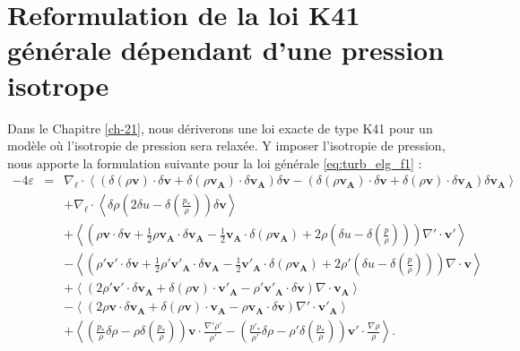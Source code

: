 \section{Reformulation de la loi \acs{K41} générale dépendant d'une pression isotrope}
\label{sec-132}

Dans le Chapitre \ref{ch-21}, nous dériverons une loi exacte de type \acs{K41} pour un modèle où l'isotropie de pression sera relaxée. Y imposer l'isotropie de pression, nous apporte la formulation suivante pour la loi générale \eqref{eq:turb_elg_f1} : 
\begin{equation}
\boxed{
\begin{array}{lcl}
\label{eq:turb_elg_f2}-4\varepsilon &=& \nabla_{\boldsymbol{\ell}} \cdot \left<\left(\delta \left(\rho\boldsymbol{v}\right) \cdot \delta \boldsymbol{v}+ \delta \left(\rho\boldsymbol{v_A}\right) \cdot \delta \boldsymbol{v_A}\right) \delta \boldsymbol{v}  -\left(\delta \left(\rho\boldsymbol{v_A}\right) \cdot \delta \boldsymbol{v}  + \delta \left(\rho\boldsymbol{v}\right) \cdot \delta \boldsymbol{v_A}  \right) \delta \boldsymbol{v_A} \right>\\
&& + \nabla_{\boldsymbol{\ell}} \cdot \left<\delta \rho  \left(2\delta u - \delta \left(\frac{p_*}{\rho}\right)\right)\delta \boldsymbol{v}\right> \\
&& +\left< \left(\rho \boldsymbol{v} \cdot \delta \boldsymbol{v} +\frac{1}{2} \rho \boldsymbol{v_A} \cdot \delta \boldsymbol{v_A} -\frac{1}{2} \boldsymbol{v_A} \cdot \delta \left(\rho \boldsymbol{v_A}\right) + 2\rho \left(\delta u - \delta \left(\frac{p}{\rho}\right)\right) \right) \nabla' \cdot \boldsymbol{v'} \right>\\
&& -\left<\left( \rho' \boldsymbol{v'} \cdot \delta \boldsymbol{v} +\frac{1}{2} \rho' \boldsymbol{v'_A} \cdot \delta \boldsymbol{v_A} -\frac{1}{2} \boldsymbol{v'_A} \cdot \delta \left(\rho \boldsymbol{v_A}\right) + 2\rho' \left(\delta u - \delta \left(\frac{p}{\rho}\right)\right)  \right)\nabla \cdot \boldsymbol{v}\right>\\
&&+ \left<\left(2 \rho' \boldsymbol{v'} \cdot \delta \boldsymbol{v_A}+ \delta\left(\rho \boldsymbol{v}\right) \cdot \boldsymbol{v'_A} - \rho' \boldsymbol{v'_A} \cdot \delta \boldsymbol{v}  \right)\nabla \cdot \boldsymbol{v_A}\right>\\
&&- \left<\left(2\rho \boldsymbol{v} \cdot \delta \boldsymbol{v_A} + \delta\left(\rho \boldsymbol{v}\right) \cdot \boldsymbol{v_A} - \rho \boldsymbol{v_A} \cdot \delta \boldsymbol{v}  \right)\nabla' \cdot \boldsymbol{v'_A}\right> \\
&&+  \left< \left(\frac{p_*}{\rho} \delta \rho - \rho \delta \left(\frac{p_*}{\rho}\right)  \right)\boldsymbol{v} \cdot \frac{\nabla' \rho'}{\rho'} - \left(\frac{p'_*}{\rho'} \delta \rho - \rho' \delta \left(\frac{p_*}{\rho}\right)  \right)  \boldsymbol{v'} \cdot \frac{\nabla \rho}{\rho} \right>.
\end{array}}
\end{equation} 
